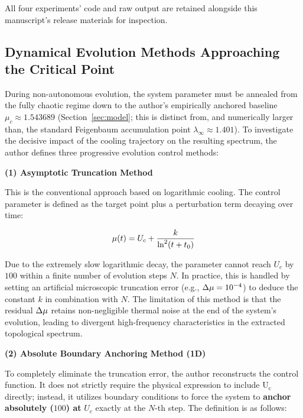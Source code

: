 \documentclass[mca,article,submit,oneauthor,pdftex]{Definitions/mdpi}
\begin{document}
All four experiments' code and raw output are retained alongside this
manuscript's release materials for inspection.

\subsection{Dynamical Evolution Methods Approaching the Critical Point}

During non-autonomous evolution, the system parameter must be annealed
from the fully chaotic regime down to the author's empirically anchored baseline
\(\mu_c\approx1.543689\) (Section~\ref{sec:model}; this is distinct from,
and numerically larger than, the standard Feigenbaum accumulation point
\(\lambda_\infty\approx1.401\)). To investigate
the decisive impact of the cooling trajectory on the resulting spectrum,
the author defines three progressive evolution control methods:

\textbf{(1) Asymptotic Truncation Method}

This is the conventional approach based on logarithmic cooling. The
control parameter is defined as the target point plus a perturbation
term decaying over time:

\begin{equation}
\text{\ensuremath{\mu}}({t})={U}_{{c}}+\frac{{k}}{\text{ln}^{\text{2}}\text{(}{t}+{t}_{{0}}\text{)}}
\end{equation}

Due to the extremely slow logarithmic decay, the parameter cannot reach
\({U}_{{c}}\) by \(\text{100}\) within a finite number of
evolution steps \({N}\). In practice, this is handled by setting an
artificial microscopic truncation error (e.g.,
\(\text{\ensuremath{\Delta}}\text{\ensuremath{\mu}}=\text{10}^{\text{\ensuremath{-}4}}\)) to deduce the
constant \({k}\) in combination with \({N}\). The limitation
of this method is that the residual \(\text{\ensuremath{\Delta}}\text{\ensuremath{\mu}}\) retains
non-negligible thermal noise at the end of the system's evolution,
leading to divergent high-frequency characteristics in the extracted
topological spectrum.

\textbf{(2) Absolute Boundary Anchoring Method (1D)}

To completely eliminate the truncation error, the author reconstructs the control
function. It does not strictly require the physical expression to
include \(\text{U}_{\text{c}}\) directly; instead, it utilizes boundary
conditions to force the system to \textbf{anchor absolutely
(}\(\text{100}\)\textbf{) at} \({U}_{{c}}\) exactly at the
\({N}\)-th step. The definition is as follows:
\end{document}
